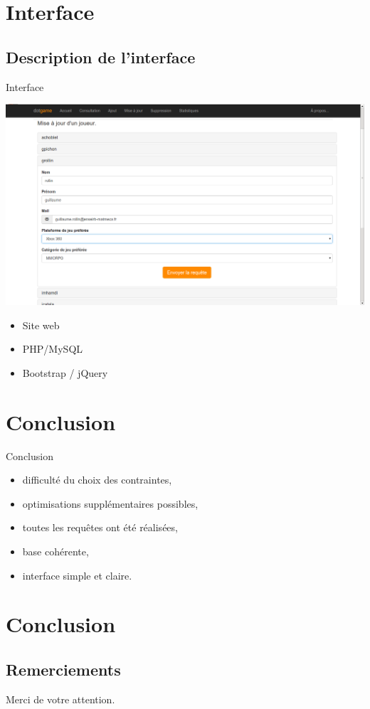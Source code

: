 \documentclass{beamer}
\begin{document}
\section{Interface}
\subsection{Description de l'interface}
\begin{frame}
\begin{block}{Interface}
\begin{center}
\includegraphics[scale=0.20]{capture2.png}
\end{center}
\begin{itemize}
\item Site web
\item PHP/MySQL
\item Bootstrap / jQuery
\end{itemize}
\end{block}
\end{frame}

\section*{Conclusion}
\begin{frame}
\begin{block}{Conclusion}
\begin{itemize}

\item{difficulté du choix des contraintes,}
\item{optimisations supplémentaires possibles,}

\item{toutes les requêtes ont été réalisées,}
\item{base cohérente,}
\item{interface simple et claire.}

\end{itemize}
\end{block}
\end{frame}


\section{Conclusion}
\subsection{Remerciements}
\begin{frame}
  \begin{center}
    \large{Merci de votre attention.}
  \end{center}
  \end{frame}
\end{document}
